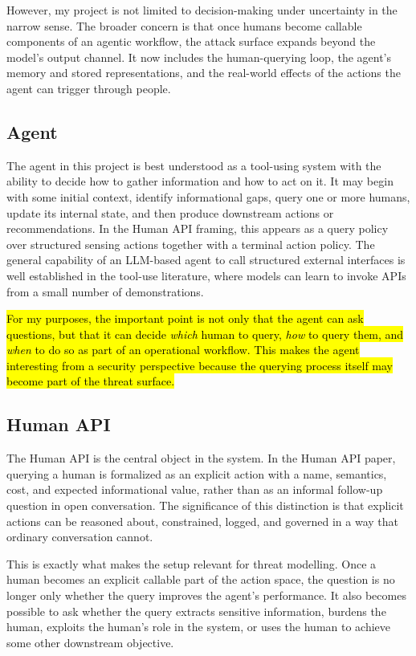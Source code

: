 \documentclass[11pt]{article}
\begin{document}
However, my project is not limited to decision-making under uncertainty in the narrow sense. The broader concern is that once humans become callable components of an agentic workflow, the attack surface expands beyond the model's output channel. It now includes the human-querying loop, the agent's memory and stored representations, and the real-world effects of the actions the agent can trigger through people.

\subsection{Agent}

The agent in this project is best understood as a tool-using system with the ability to decide how to gather information and how to act on it. It may begin with some initial context, identify informational gaps, query one or more humans, update its internal state, and then produce downstream actions or recommendations. In the Human API framing, this appears as a query policy over structured sensing actions together with a terminal action policy. \citep{oliver2026humanapi} The general capability of an LLM-based agent to call structured external interfaces is well established in the tool-use literature, where models can learn to invoke APIs from a small number of demonstrations. \citep{schick2023toolformer}

\hl{For my purposes, the important point is not only that the agent can ask questions, but that it can decide \emph{which} human to query, \emph{how} to query them, and \emph{when} to do so as part of an operational workflow. This makes the agent interesting from a security perspective because the querying process itself may become part of the threat surface.}

\subsection{Human API}

The Human API is the central object in the system. In the Human API paper, querying a human is formalized as an explicit action with a name, semantics, cost, and expected informational value, rather than as an informal follow-up question in open conversation. The significance of this distinction is that explicit actions can be reasoned about, constrained, logged, and governed in a way that ordinary conversation cannot. \citep{oliver2026humanapi}

This is exactly what makes the setup relevant for threat modelling. Once a human becomes an explicit callable part of the action space, the question is no longer only whether the query improves the agent's performance. It also becomes possible to ask whether the query extracts sensitive information, burdens the human, exploits the human's role in the system, or uses the human to achieve some other downstream objective.
\end{document}
